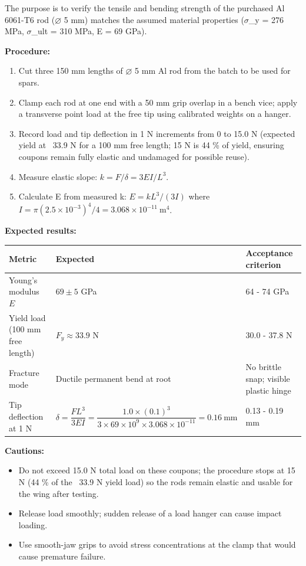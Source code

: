 \documentclass[10pt,a4paper]{article}
\begin{document}
The purpose is to verify the tensile and bending strength of the purchased Al 6061-T6 rod ($\varnothing$ 5 mm) matches the assumed material properties (${\sigma}$\_y = 276 MPa, ${\sigma}$\_ult = 310 MPa, E = 69 GPa).

\textbf{Procedure:}
\begin{enumerate}[noitemsep,topsep=2pt]
\item Cut three 150 mm lengths of $\varnothing$ 5 mm Al rod from the batch to be used for spars.
\item Clamp each rod at one end with a 50 mm grip overlap in a bench vice; apply a transverse point load at the free tip using calibrated weights on a hanger.
\item Record load and tip deflection in 1 N increments from 0 to 15.0 N (expected yield at ~33.9 N for a 100 mm free length; 15 N is 44 \% of yield, ensuring coupons remain fully elastic and undamaged for possible reuse).
\item Measure elastic slope: $k = F/\delta = 3EI/L^3$.
\item Calculate E from measured k: $E = kL^3 / (3I)$ where $I = \pi(2.5 \times 10^{-3})^4 / 4 = 3.068 \times 10^{-11}\ \text{m}^4$.
\end{enumerate}

\textbf{Expected results:}

\begin{center}
\begin{tabularx}{\textwidth}{|l|l|X|}
\hline
Metric & Expected & Acceptance criterion \\
\hline
Young's modulus $E$ & $69 \pm 5$ GPa & 64 - 74 GPa \\
\hline
Yield load (100 mm free length) & $F_y \approx 33.9$ N & 30.0 - 37.8 N \\
\hline
Fracture mode & Ductile permanent bend at root & No brittle snap; visible plastic hinge \\
\hline
Tip deflection at 1 N & $\delta = \dfrac{F L^3}{3EI} = \dfrac{1.0 \times (0.1)^3}{3 \times 69 \times 10^9 \times 3.068 \times 10^{-11}} = 0.16\ \text{mm}$ & 0.13 - 0.19 mm \\
\hline
\end{tabularx}
\end{center}

\textbf{Cautions:}
\begin{itemize}[noitemsep,topsep=2pt]
\item Do not exceed 15.0 N total load on these coupons; the procedure stops at 15 N (44 \% of the ~33.9 N yield load) so the rods remain elastic and usable for the wing after testing.
\item Release load smoothly; sudden release of a load hanger can cause impact loading.
\item Use smooth-jaw grips to avoid stress concentrations at the clamp that would cause premature failure.
\end{itemize}
\end{document}
